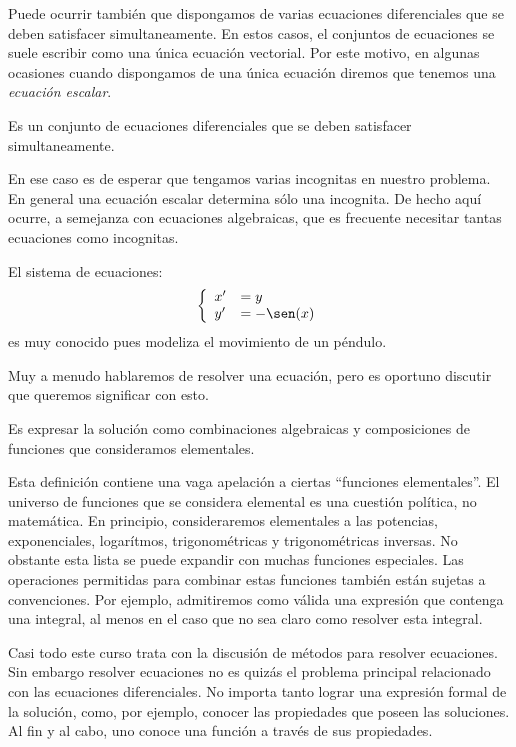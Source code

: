 Puede ocurrir también que dispongamos de varias ecuaciones diferenciales
que se deben satisfacer simultaneamente. 
En estos casos, el conjuntos de ecuaciones se suele escribir como una única 
ecuación vectorial. Por este motivo, en algunas ocasiones cuando dispongamos de una
única ecuación diremos que tenemos una \emph{ecuación  escalar}.

\begin{definicion}{} Es un  conjunto de ecuaciones diferenciales que se deben satisfacer simultaneamente.
 \end{definicion}

En ese caso es  de esperar que tengamos varias incognitas en
nuestro problema. En general una ecuación escalar determina sólo una incognita. De hecho aquí ocurre, a semejanza con ecuaciones algebraicas, que es frecuente necesitar tantas ecuaciones como incognitas.

\begin{ejemplo}{} El sistema de ecuaciones:
\[\left\{ \begin{array}{l l} x'&=y \\y'&=-\sen(x) \end{array}\right.\]
es muy conocido pues modeliza el movimiento de un péndulo.
\end{ejemplo}



Muy a menudo hablaremos de resolver una ecuación, pero es oportuno discutir que queremos significar con esto.

\begin{definicion}{} Es expresar la solución como combinaciones algebraicas y composiciones de funciones que consideramos elementales.
\end{definicion}

Esta definición contiene una vaga apelación a ciertas ``funciones elementales''. El universo de funciones que se considera elemental es una cuestión política, no matemática. En  principio, consideraremos elementales a las potencias, exponenciales, logarítmos, trigonométricas y trigonométricas inversas. No obstante esta lista se puede expandir con muchas funciones especiales.  Las operaciones permitidas para combinar estas funciones
también están sujetas a convenciones. Por ejemplo, admitiremos como válida una expresión que contenga una integral, al menos en el caso que no sea claro como resolver esta integral.

 Casi todo este curso trata con la discusión de métodos para resolver ecuaciones.  
 Sin embargo resolver ecuaciones no es quizás el problema principal relacionado 
 con las ecuaciones diferenciales. No importa tanto lograr una expresión 
 formal de la solución, como, por ejemplo, conocer las propiedades que poseen las soluciones. 
 Al fin y al cabo, uno conoce una función a través de sus propiedades.
 





